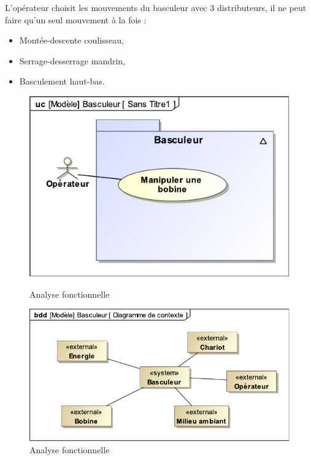 L'opérateur choisit les mouvements du basculeur avec 3 distributeurs, il ne peut faire qu'un seul mouvement à la fois : 
\begin{itemize}
 \item Montée-descente coulisseau,
 \item Serrage-desserrage mandrin,
 \item Basculement haut-bas.
\end{itemize}

\newpage

\begin{figure}[ht!]
\begin{minipage}{0.45\linewidth}
\begin{center}
 \includegraphics[width=0.9\linewidth]{img/fig04a}
\end{center}
\caption{Analyse fonctionnelle}
\label{fig04a}
\end{minipage}
\hfill
\begin{minipage}{0.45\linewidth}
\begin{center}
 \includegraphics[width=0.9\linewidth]{img/fig04b}
\end{center}
\caption{Analyse fonctionnelle}
\label{fig04b}
\end{minipage}
\end{figure}

